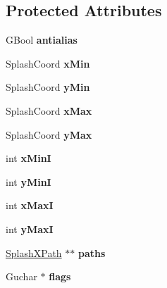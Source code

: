 \subsection*{Protected Attributes}
\begin{DoxyCompactItemize}
\item 
\mbox{\label{class_splash_clip_ade8371991818243bd923287a35d696cc}} 
G\+Bool {\bfseries antialias}
\item 
\mbox{\label{class_splash_clip_aed72c61c323f268593c02f04e42f3e11}} 
Splash\+Coord {\bfseries x\+Min}
\item 
\mbox{\label{class_splash_clip_a93446799a42f866f8be6c959220b7e79}} 
Splash\+Coord {\bfseries y\+Min}
\item 
\mbox{\label{class_splash_clip_a644c96c446a09ad579f324228342d44c}} 
Splash\+Coord {\bfseries x\+Max}
\item 
\mbox{\label{class_splash_clip_a4a9b5fe0209b3694e204aedcb7c602fa}} 
Splash\+Coord {\bfseries y\+Max}
\item 
\mbox{\label{class_splash_clip_a437573291b8bf89cd1fe2fda18b9b706}} 
int {\bfseries x\+MinI}
\item 
\mbox{\label{class_splash_clip_a2e014d3e50694ff2774a2b7e572ce456}} 
int {\bfseries y\+MinI}
\item 
\mbox{\label{class_splash_clip_ac39f9c0c53fe82d4f7fac67ef2c1c962}} 
int {\bfseries x\+MaxI}
\item 
\mbox{\label{class_splash_clip_a1efa4f59411a15753358af666247bd5d}} 
int {\bfseries y\+MaxI}
\item 
\mbox{\label{class_splash_clip_a3cad25b41354768ebbe256c30c763c94}} 
\hyperlink{class_splash_x_path}{Splash\+X\+Path} $\ast$$\ast$ {\bfseries paths}
\item 
\mbox{\label{class_splash_clip_acd47b72afea9018f2565341692c44c3f}} 
Guchar $\ast$ {\bfseries flags}
$$
\end{DoxyCompactItemize}
